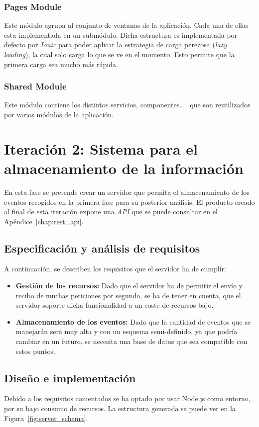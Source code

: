  \subsubsection{Pages Module}
 Este módulo agrupa al conjunto de ventanas de la aplicación. Cada una de ellas esta implementada en un submódulo. Dicha estructura es implementada por defecto por \textit{Ionic} para poder aplicar la estrategia de carga perezosa (\textit{lazy loading}), la cual solo carga lo que se ve en el momento. Esto permite que la primera carga sea mucho más rápida.
 
 \subsubsection{Shared Module}
 Este módulo contiene los distintos servicios, componentes\dots~ que son reutilizados por varios módulos de la aplicación.
 

\section{Iteración 2: Sistema para el almacenamiento de la información}
En esta fase se pretende crear un servidor que permita el almacenamiento de los eventos recogidos en la primera fase para su posterior análisis. El producto creado al final de esta iteración expone una \textit{API} que se puede consultar en el Apéndice~\ref{chap:rest_api}.

\subsection{Especificación y análisis de requisitos}
A continuación, se describen los requisitos que el servidor ha de cumplir:
\begin{itemize}
    \item \textbf{Gestión de los recursos:} Dado que el servidor ha de permitir el envío y recibo de muchas peticiones por segundo, se ha de tener en cuenta, que el servidor soporte dicha funcionalidad a un coste de recursos bajo.
    
     \item \textbf{Almacenamiento de los eventos:} Dado que la cantidad de eventos que se manejarán será muy alta y con un esquema semi-definido, ya que podría cambiar en un futuro, se necesita una base de datos que sea compatible con estos puntos.
\end{itemize}
\subsection{Diseño e implementación}
 Debido a los requisitos comentados se ha optado por usar Node.js como entorno, por su bajo consumo de recursos. La estructura generada se puede ver en la Figura~\ref{fig:server_schema}.
 

